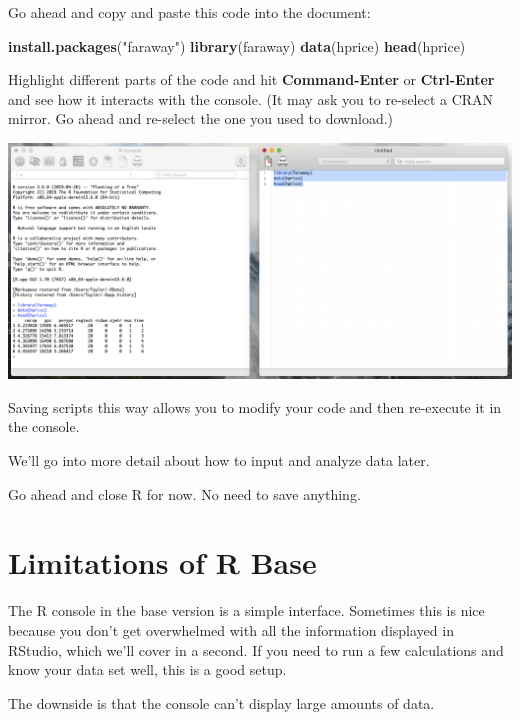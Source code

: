 \documentclass[
]{book}
\newenvironment{Shaded}{\begin{snugshade}}{\end{snugshade}}
\newcommand{\KeywordTok}[1]{\textcolor[rgb]{0.13,0.29,0.53}{\textbf{#1}}}
\newcommand{\NormalTok}[1]{#1}
\newcommand{\StringTok}[1]{\textcolor[rgb]{0.31,0.60,0.02}{#1}}
\begin{document}
Go ahead and copy and paste this code into the document:

\begin{Shaded}
\begin{Highlighting}[]
  \KeywordTok{install.packages}\NormalTok{(}\StringTok{"faraway"}\NormalTok{)}
  \KeywordTok{library}\NormalTok{(faraway)}
  \KeywordTok{data}\NormalTok{(hprice)}
  \KeywordTok{head}\NormalTok{(hprice)}
\end{Highlighting}
\end{Shaded}

Highlight different parts of the code and hit \textbf{Command-Enter} or \textbf{Ctrl-Enter} and see how it interacts with the console. (It may ask you to re-select a CRAN mirror. Go ahead and re-select the one you used to download.)

\begin{center}\includegraphics[width=0.75\linewidth]{1.8_Run_Code} \end{center}

Saving scripts this way allows you to modify your code and then re-execute it in the console.

We'll go into more detail about how to input and analyze data later.

Go ahead and close R for now. No need to save anything.

\hypertarget{limitations-of-r-base}{%
\section{Limitations of R Base}\label{limitations-of-r-base}}

The R console in the base version is a simple interface. Sometimes this is nice because you don't get overwhelmed with all the information displayed in RStudio, which we'll cover in a second. If you need to run a few calculations and know your data set well, this is a good setup.

The downside is that the console can't display large amounts of data.
\end{document}
